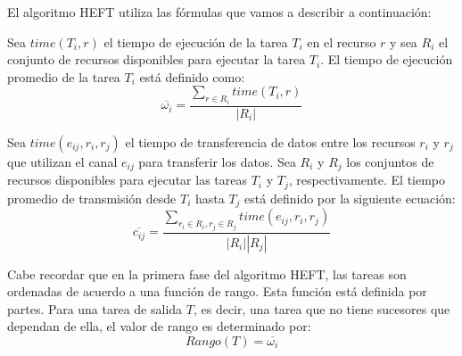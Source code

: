 

El algoritmo HEFT utiliza las fórmulas que vamos a describir a continuación:

Sea $time(T_i, r)$ el tiempo de ejecución de la tarea $T_i$ en el recurso $r$ y sea $R_i$ el conjunto de recursos disponibles para ejecutar la tarea $T_i$. El tiempo de ejecución promedio de la tarea $T_i$ está definido como:
\begin{equation}
\label{ecc:heft1}
\overline{\omega_i} = \frac{\sum_{r \in R_i} time(T_i, r)}{|R_i|}
\end{equation}

Sea $time(e_{ij}, r_i, r_j)$ el tiempo de transferencia de datos entre los recursos $r_i$ y $r_j$ que utilizan el canal $e_{ij}$ para transferir los datos. Sea $R_i$ y $R_j$ los conjuntos de recursos disponibles para ejecutar las tareas $T_i$ y $T_j$, respectivamente. El tiempo promedio de transmisión desde $T_i$ hasta $T_j$ está definido por la siguiente ecuación:
\begin{equation}
\label{ecc:heft2}
\overline{c_{ij}} = \frac{ \sum_{r_i \in R_i, r_j \in R_j} {time(e_{ij}, r_i, r_j)} }{|R_i| |R_j|}
\end{equation}

Cabe recordar que en la primera fase del algoritmo HEFT, las tareas son ordenadas de acuerdo a una función de rango. Esta función está definida por partes. Para una tarea de salida $T$, es decir, una tarea que no tiene sucesores que dependan de ella, el valor de rango es determinado por:
\begin{equation}
\label{ecc:heft3}
Rango(T) = \overline{\omega_i}
\end{equation}

